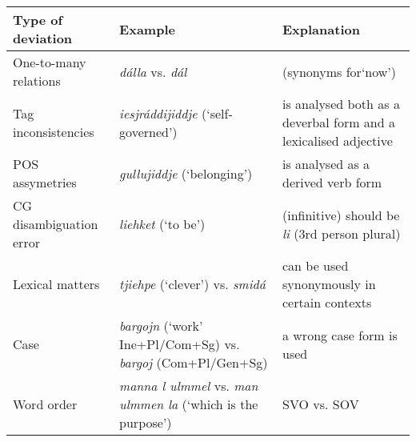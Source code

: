 \documentclass[11pt]{article}
\begin{document}
  \begin{tabular}{|l|p{4cm}|p{5cm}|} %
    \hline
      \textbf{Type of deviation} & \textbf{Example} &\textbf{Explanation}\\
    \hline
      One-to-many relations & \textit{dálla} vs. \textit{dál} & (synonyms for`now')\\
    \hline
      Tag inconsistencies       & \textit{iesjráddijiddje} (`self-governed') & is analysed both as a deverbal form and a lexicalised adjective \\
    \hline
      POS assymetries            & \textit{gullujiddje} (`belonging') & is analysed as a derived verb form \\
    \hline
      CG disambiguation \break error & \textit{liehket} (`to be') & (infinitive) should be \textit{li} (3rd person plural) \\
    \hline
      Lexical matters       & \textit{tjiehpe} (`clever') vs. \textit{smidá} &   can be used synonymously in certain contexts \\ %
    \hline
      Case                  & \textit{bargojn} (`work' Ine+Pl/Com+Sg) vs. \textit{bargoj} (Com+Pl/Gen+Sg) & a wrong case form is used \\
    \hline
      Word order            & \textit{manna l ulmmel} vs.  \textit{man ulmmen la} (`which is the purpose') & SVO vs. SOV \\
    \hline
  \end{tabular}
\end{document}
